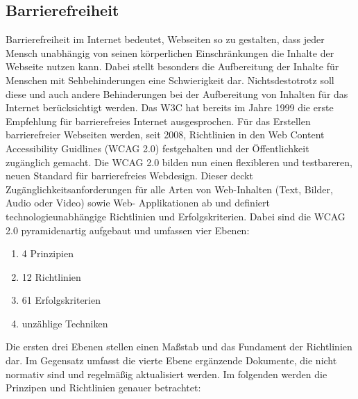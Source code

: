 \subsection{Barrierefreiheit}
Barrierefreiheit im Internet bedeutet, Webseiten so zu gestalten, dass
jeder Mensch unabhängig von seinen körperlichen Einschränkungen die
Inhalte der Webseite nutzen kann. Dabei stellt besonders die Aufbereitung der
Inhalte für Menschen mit Sehbehinderungen eine Schwierigkeit dar.
Nichtsdestotrotz soll diese und auch andere Behinderungen bei der
Aufbereitung von Inhalten für das Internet berücksichtigt werden.
\newline\newline
Das W3C hat bereits im Jahre 1999 die erste Empfehlung für barrierefreies
Internet ausgesprochen. Für das Erstellen barrierefreier Webseiten werden,
seit 2008, Richtlinien in den Web Content Accessibility Guidlines (WCAG 2.0)
festgehalten und der Öffentlichkeit zugänglich gemacht. Die WCAG 2.0 bilden
nun einen flexibleren und testbareren, neuen Standard für barrierefreies
Webdesign. Dieser deckt Zugänglichkeitsanforderungen für alle
Arten von Web-Inhalten (Text, Bilder, Audio oder Video) sowie Web-
Applikationen ab und definiert technologieunabhängige Richtlinien und
Erfolgskriterien.
\newline\newline
Dabei sind die WCAG 2.0 pyramidenartig aufgebaut und umfassen vier Ebenen:
\begin{enumerate}
  \item 4 Prinzipien
  \item 12 Richtlinien
  \item 61 Erfolgskriterien
  \item unzählige Techniken
\end{enumerate}
Die ersten drei Ebenen stellen einen Maßstab und das Fundament der Richtlinien
dar. Im Gegensatz umfasst die vierte Ebene ergänzende Dokumente, die nicht
normativ sind und regelmäßig aktualisiert werden.
Im folgenden werden die Prinzipen und Richtlinien genauer betrachtet:
